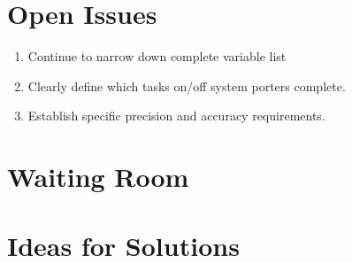 \documentclass[paper=letter, fontsize=10pt]{scrartcl}
\numberwithin{equation}{section}		%
\numberwithin{figure}{section}			%
\numberwithin{table}{section}				%
\begin{document}
\section{Open Issues}
\begin{enumerate}
	\item Continue to narrow down complete variable list
	\item Clearly define which tasks on/off system porters complete.
	\item Establish specific precision and accuracy requirements.
\end{enumerate}

\section{Waiting Room}

\section{Ideas for Solutions}

\end{document}
